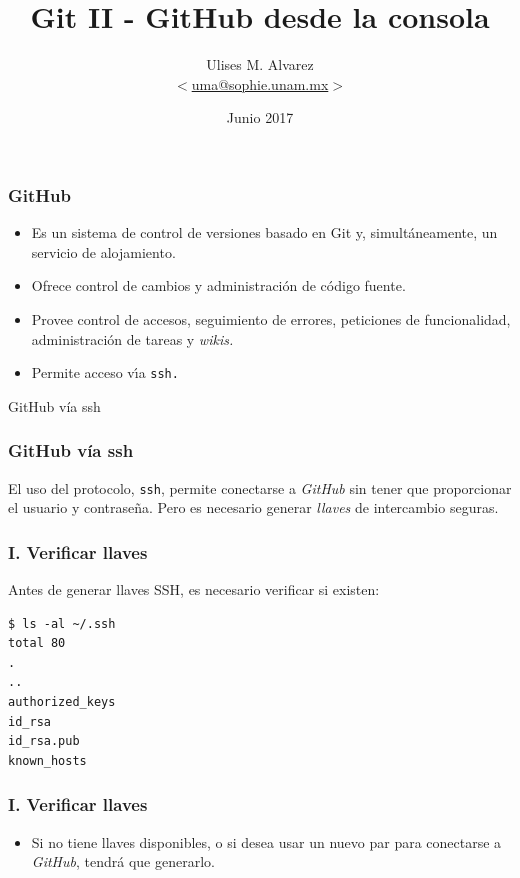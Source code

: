 \documentclass{beamer}
\title{Git II - GitHub desde la consola}
\date{Junio 2017}
\author{Ulises M. Alvarez\\ %
   $<$\href{mailto:uma@sophie.unam.mx}%
   {uma@sophie.unam.mx}$>$
}
\institute{Sophie UNAM}
\begin{document}
\maketitle



\begin{frame}
  \frametitle{GitHub}
  \begin{itemize}
  \item Es un sistema de control de versiones basado en Git y,
    simult\'aneamente, un servicio de alojamiento.
  \item Ofrece control de cambios y administraci\'on de c\'odigo
    fuente.
  \item Provee control de accesos, seguimiento de errores, peticiones
    de funcionalidad, administraci\'on de tareas y \textit{wikis.}
  \item Permite acceso v\'\i{}a \texttt{ssh.}
  \end{itemize}
\end{frame}

\begin{frame}[standout]
  GitHub vía ssh
\end{frame}

\begin{frame}[fragile]
  \frametitle{GitHub vía ssh}
  El uso del protocolo, \texttt{ssh}, permite conectarse a \textit{GitHub}
  sin tener que proporcionar el usuario y contrase\~na. Pero es necesario
  generar \emph{llaves} de intercambio seguras.
\end{frame}

\begin{frame}[fragile]
  \frametitle{I. Verificar llaves}
  Antes de generar llaves SSH, es necesario verificar si existen:
\begin{verbatim}
$ ls -al ~/.ssh
total 80
.
..
authorized_keys
id_rsa
id_rsa.pub
known_hosts
\end{verbatim}
\end{frame}

\begin{frame}[fragile]
  \frametitle{I. Verificar llaves}
  \begin{itemize}
  \item Si no tiene llaves disponibles, o si desea usar un nuevo par para
    conectarse a \textit{GitHub}, tendr\'a{} que generarlo.
  \end{itemize}
\end{frame}
\end{document}
